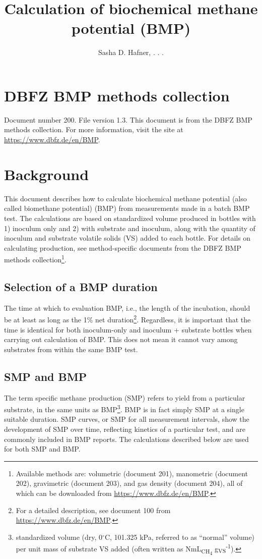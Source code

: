 \documentclass[]{article}
\title {Calculation of biochemical methane potential (BMP)}
\author{Sasha D. Hafner, . . .}
\begin{document}
\maketitle

\section{DBFZ BMP methods collection}
Document number 200.
File version 1.3. 
This document is from the DBFZ BMP methods collection.
For more information, visit the site at \url{https://www.dbfz.de/en/BMP}.

\section{Background}
This document describes how to calculate biochemical methane potential (also called biomethane potential) (BMP) from measurements made in a batch BMP test.
The calculations are based on standardized  volume produced in bottles with 1) inoculum only and 2) with substrate and inoculum, along with the quantity of inoculum and substrate volatile solids (VS) added to each bottle.
For details on calculating  production, see method-specific documents from the DBFZ BMP methods collection\footnote{
  Available methods are: volumetric (document 201), manometric (document 202), gravimetric (document 203), and gas density (document 204), all of which can be downloaded from \url{https://www.dbfz.de/en/BMP}.
}.

\subsection{Selection of a BMP duration}
The time at which to evaluation BMP, i.e., the length of the incubation, should be at least as long as the 1\% net duration\footnote{
  For a detailed description, see document 100 from \url{https://www.dbfz.de/en/BMP}.
}.
Regardless, it is important that the time is identical for both inoculum-only and inoculum + substrate bottles when carrying out calculation of BMP.
This does not mean it cannot vary among substrates from within the same BMP test.

\subsection{SMP and BMP}
The term specific methane production (SMP) refers to  yield from a particular substrate, in the same units as BMP\footnote{
standardized  volume (dry, 0$^\circ$C, 101.325 kPa, referred to as ``normal'' volume) per unit mass of substrate VS added (often written as NmL\textsubscript{CH\textsubscript{4}} g\textsubscript{VS}\textsuperscript{-1}).
}.
BMP is in fact simply SMP at a single suitable duration.
SMP curves, or SMP for all measurement intervals, show the development of SMP over time, reflecting kinetics of a particular test, and are commonly included in BMP reports.
The calculations described below are used for both SMP and BMP.
\end{document}
